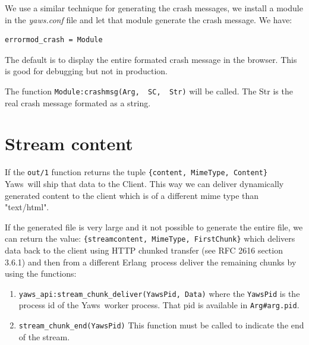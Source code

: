 \documentclass[11pt,oneside,english]{book}
\newcommand{\Erlang}            %
        {{\sc Erlang}}
\newcommand{\Yaws}            %
        {{\sc Yaws}}
\begin{document}
We use a similar technique for generating the crash messages, we
install a module in the \textit{yaws.conf} file and let that module generate
the crash message.
We have:
\begin{verbatim}
errormod_crash = Module
\end{verbatim}

The  default  is  to  display the
entire  formated  crash   message   in   the
browser.  This is good for debugging but not
in production.

The function \verb+Module:crashmsg(Arg,  SC,  Str)+
will  be  called.  The Str is the real crash
message formated as a string.



\section{Stream content}

If the \verb+out/1+ function returns the tuple
\verb+{content, MimeType, Content}+ \Yaws\  will
ship that data to the Client. This way we can
deliver dynamically generated content to the client
which is of a different mime type than "text/html".

If the generated file is very large and it not
possible to generate the entire file, we can
return the value:
\verb+{streamcontent, MimeType, FirstChunk}+ which delivers
data back to the client using HTTP chunked transfer (see
RFC 2616 section 3.6.1) and then from a different \Erlang\
process deliver the remaining chunks by using the functions:
\begin{enumerate}
\item \verb+yaws_api:stream_chunk_deliver(YawsPid, Data)+ where the
  \verb+YawsPid+ is the process id of the \Yaws\ worker process. That
  pid is available in \verb+Arg#arg.pid+.

\item \verb+stream_chunk_end(YawsPid)+ This function must be called to
  indicate the end of the stream.
\end{enumerate}
\end{document}
